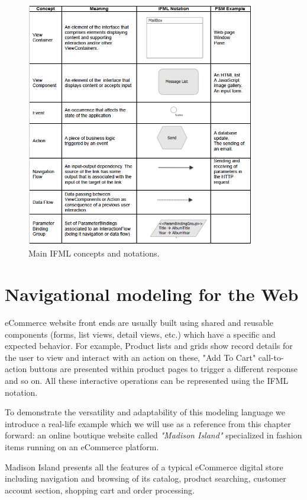 \vspace{0.5cm}
\begin{figure}[H]
  \centering
    \includegraphics[width=10cm]{images/ifml.jpg}
  \caption{Main IFML concepts and notations.}
  \label{fig:ifml}
\end{figure}
\vspace{0.5cm}

\newpage

\section{Navigational modeling for the Web}

eCommerce website front ends are usually built using shared and reusable components (forms, list views, detail views, etc.) which have a specific and expected behavior.
For example, Product lists and grids show record details for the user to view and interact with an action on these, "Add To Cart" call-to-action buttons are presented within product pages to trigger a different response and so on.
All these interactive operations can be represented using the IFML notation.

To demonstrate the versatility and adaptability of this modeling language we introduce a real-life example which we will use as a reference from this chapter forward: an online boutique website called \textit{"Madison Island"} specialized in fashion items running on an eCommerce platform.

Madison Island presents all the features of a typical eCommerce digital store including navigation and browsing of its catalog, product searching, customer account section, shopping cart and order processing. 


